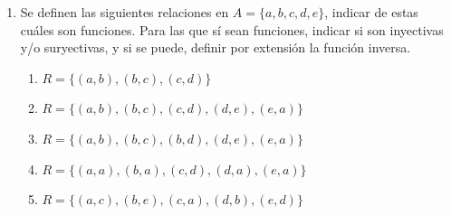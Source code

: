 \documentclass[a4paper]{article}
\newcommand{\exercise}{\item}
\begin{document}
\begin{enumerate}
\begin{enumerate} [label=(\alph*)]
		\item El mismo mayorista anterior pero redondeando como no tiene monedas inferiores a un peso para dar vuelto se ve obligado a redondear para abajo el valor cobrado

		\item Otro mayorista vende las galletitas sueltas por peso y no por paquete. Ofrece lo siguiente: hasta 3kg se vende a 30 pesos el kilo; más de 3kg y hasta 6kg se vende a 25 pesos el kilo; más de 6kg se vende a 20 pesos el kilo. Por ejemplo, si una persona compra 7kg y paga 7 x 20 = 140 pesos. Debido a que el proveedor cobra digitalmente, se puede pagar el monto exacto sin redondear.
	\end{enumerate}

	\exercise Se definen las siguientes relaciones en $A = \{a, b, c, d, e\}$, indicar de estas cuáles son 	funciones. Para las que sí sean funciones, indicar si son inyectivas y/o suryectivas, y si se puede, definir por extensión la función inversa.
	\begin{enumerate} [label=(\alph*)]
		\item $R = \{(a,b), (b,c), (c,d)\}$
		\item $R = \{(a,b), (b,c), (c,d), (d,e), (e,a)\}$
		\item $R = \{(a,b), (b,c), (b,d), (d,e), (e,a)\}$
		\item $R = \{(a,a), (b,a), (c,d), (d,a), (e,a)\}$
		\item $R = \{(a,c), (b,e), (c,a), (d,b), (e,d)\}$
	\end{enumerate}


\end{enumerate}
\end{document}
